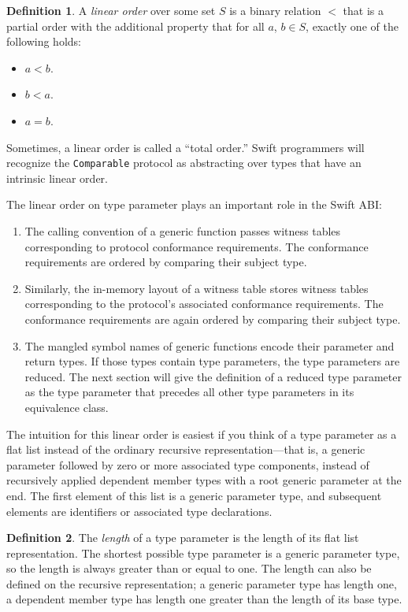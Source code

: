 \documentclass[a4paper,headsepline,bibliography=totoc,toc=flat,fleqn,twoside=semi]{scrbook}
\theoremstyle{definition}
\newtheorem{definition}{Definition}[chapter]
\theoremstyle{definition}
\theoremstyle{definition}
\begin{document}
\begin{definition} A \emph{linear order} over some set $S$ is a binary relation $<$ that is a partial order with the additional property that for all $a$, $b\in S$, exactly one of the following holds:
\begin{itemize}
\item $a<b$.
\item $b<a$.
\item $a=b$.
\end{itemize}
Sometimes, a linear order is called a ``total order.'' Swift programmers will recognize the \texttt{Comparable} protocol as abstracting over types that have an intrinsic linear order.
\end{definition}

The linear order on type parameter plays an important role in the Swift ABI:
\begin{enumerate}
\item The calling convention of a generic function passes witness tables corresponding to protocol conformance requirements. The conformance requirements are ordered by comparing their subject type.
\item Similarly, the in-memory layout of a witness table stores witness tables corresponding to the protocol's associated conformance requirements. The conformance requirements are again ordered by comparing their subject type.
\item The mangled symbol names of generic functions encode their parameter and return types. If those types contain type parameters, the type parameters are reduced. The next section will give the definition of a reduced type parameter as the type parameter that precedes all other type parameters in its equivalence class.
\end{enumerate}
The intuition for this linear order is easiest if you think of a type parameter as a flat list instead of the ordinary recursive representation---that is, a generic parameter followed by zero or more associated type components, instead of recursively applied dependent member types with a root generic parameter at the end. The first element of this list is a generic parameter type, and subsequent elements are identifiers or associated type declarations.
\begin{definition}
The \emph{length} of a type parameter is the length of its flat list representation. The shortest possible type parameter is a generic parameter type, so the length is always greater than or equal to one. The length can also be defined on the recursive representation; a generic parameter type has length one, a dependent member type has length one greater than the length of its base type.
\end{definition}
\end{document}
